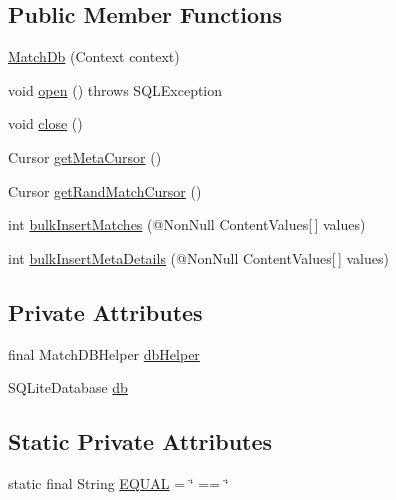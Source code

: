 \subsection*{Public Member Functions}
\begin{DoxyCompactItemize}
\item 
\hyperlink{classorg_1_1buildmlearn_1_1matchtemplate_1_1data_1_1MatchDb_a48ba3e250756306dedd2072a591847f7}{Match\+Db} (Context context)
\item 
void \hyperlink{classorg_1_1buildmlearn_1_1matchtemplate_1_1data_1_1MatchDb_abcced485982579a9031825b02be72911}{open} ()  throws S\+Q\+L\+Exception 
\item 
void \hyperlink{classorg_1_1buildmlearn_1_1matchtemplate_1_1data_1_1MatchDb_a1d549db7a7af47a4982e8847dfbaa18b}{close} ()
\item 
Cursor \hyperlink{classorg_1_1buildmlearn_1_1matchtemplate_1_1data_1_1MatchDb_a96e39bd2319627102a2444b283cc82a6}{get\+Meta\+Cursor} ()
\item 
Cursor \hyperlink{classorg_1_1buildmlearn_1_1matchtemplate_1_1data_1_1MatchDb_a1d589f7302fa879ec5c1216113975333}{get\+Rand\+Match\+Cursor} ()
\item 
int \hyperlink{classorg_1_1buildmlearn_1_1matchtemplate_1_1data_1_1MatchDb_ad20cb5540e4c07585ff24185a42d7a00}{bulk\+Insert\+Matches} (@Non\+Null Content\+Values\mbox{[}$\,$\mbox{]} values)
\item 
int \hyperlink{classorg_1_1buildmlearn_1_1matchtemplate_1_1data_1_1MatchDb_ac8b61667372ea5471dddac7051912d39}{bulk\+Insert\+Meta\+Details} (@Non\+Null Content\+Values\mbox{[}$\,$\mbox{]} values)
\end{DoxyCompactItemize}
\subsection*{Private Attributes}
\begin{DoxyCompactItemize}
\item 
final Match\+D\+B\+Helper \hyperlink{classorg_1_1buildmlearn_1_1matchtemplate_1_1data_1_1MatchDb_a4b311c06795ebfd791d02d9a0b5aa9da}{db\+Helper}
\item 
S\+Q\+Lite\+Database \hyperlink{classorg_1_1buildmlearn_1_1matchtemplate_1_1data_1_1MatchDb_a3f296966090e2bc9a95e5fd4acaf3bdc}{db}
\end{DoxyCompactItemize}
\subsection*{Static Private Attributes}
\begin{DoxyCompactItemize}
\item 
static final String \hyperlink{classorg_1_1buildmlearn_1_1matchtemplate_1_1data_1_1MatchDb_ad8c00c8127fb60c0d7f52f6d426f4792}{E\+Q\+U\+AL} = \char`\"{} == \char`\"{}
\end{DoxyCompactItemize}


